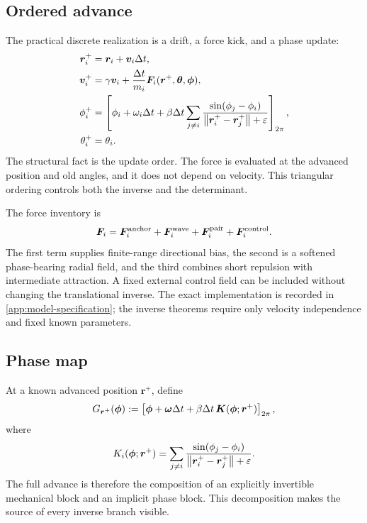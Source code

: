 \subsection{Ordered advance}

The practical discrete realization is a drift, a force kick, and a phase update:
\begin{subequations}
\label{eq:advance}
\begin{align}
\bm r_i^+
  &=\bm r_i+\bm v_i\Delta t,
  \label{eq:drift}\\
\bm v_i^+
  &=\gamma\bm v_i
  +\frac{\Delta t}{m_i}
  \bm F_i(\bm r^+,\bm\theta,\bm\phi),
  \label{eq:kick}\\
\phi_i^+
  &=
  \left[
  \phi_i+\omega_i\Delta t
  +\beta\Delta t\sum_{j\neq i}
  \frac{\sin(\phi_j-\phi_i)}
       {\left\lVert \bm r_i^+-\bm r_j^+\right\rVert+\varepsilon}
  \right]_{2\pi},
  \label{eq:phase}\\
\theta_i^+&=\theta_i.
\end{align}
\end{subequations}
The structural fact is the update order. The force is evaluated at the advanced position and old angles, and it does not depend on velocity. This triangular ordering controls both the inverse and the determinant.

The force inventory is
\begin{equation}
  \bm F_i
  =
  \bm F_i^{\rm anchor}
  +\bm F_i^{\rm wave}
  +\bm F_i^{\rm pair}
  +\bm F_i^{\rm control}.
  \label{eq:force-inventory}
\end{equation}
The first term supplies finite-range directional bias, the second is a softened phase-bearing radial field, and the third combines short repulsion with intermediate attraction. A fixed external control field can be included without changing the translational inverse. The exact implementation is recorded in \cref{app:model-specification}; the inverse theorems require only velocity independence and fixed known parameters.

\subsection{Phase map}

At a known advanced position \(\bm r^+\), define
\begin{equation}
  G_{\bm r^+}(\bm\phi)
  :=
  \left[
  \bm\phi+\bm\omega\Delta t
  +\beta\Delta t\,\bm K(\bm\phi;\bm r^+)
  \right]_{2\pi},
  \label{eq:phase-map}
\end{equation}
where
\begin{equation}
  K_i(\bm\phi;\bm r^+)
  =
  \sum_{j\neq i}
  \frac{\sin(\phi_j-\phi_i)}
       {\left\lVert \bm r_i^+-\bm r_j^+\right\rVert+\varepsilon}.
  \label{eq:phase-coupling}
\end{equation}
The full advance is therefore the composition of an explicitly invertible mechanical block and an implicit phase block. This decomposition makes the source of every inverse branch visible.


